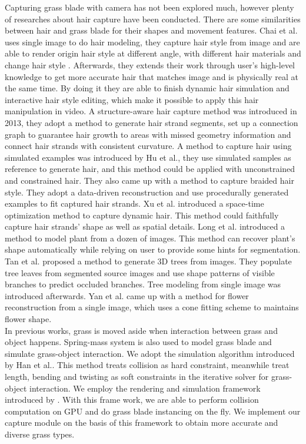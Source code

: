 \documentclass[10pt,journal,compsoc]{IEEEtran}
\begin{document}
Capturing grass blade with camera has not been explored much, however plenty of researches about hair capture have been conducted. There are some similarities between hair and grass blade for their shapes and movement features. Chai et al.\cite{chai2012single} uses single image to do hair modeling, they capture hair style from image and are able to render origin hair style at different angle, with different hair materials and change hair style . Afterwards, they extends their work through user's high-level knowledge to get more accurate hair that matches image and is physically real at the same time. By doing it they are able to finish dynamic hair simulation and interactive hair style editing, which make it possible to apply this hair manipulation in video\cite{chai2013dynamic}. A structure-aware hair capture method\cite{luo2013structure} was introduced in 2013, they adopt a method to generate hair strand segments, set up a connection graph to guarantee hair growth to areas with missed geometry information and connect hair strands with consistent curvature. A method to capture hair using simulated examples was introduced by Hu et al.\cite{hu2014robust}, they use simulated samples as reference to generate hair, and this method could be applied with unconstrained and constrained hair. They also came up with a method to capture braided hair style\cite{hu2014capturing}. They adopt a data-driven reconstruction and use procedurally generated examples to fit captured hair strands. Xu et al. introduced a space-time optimization method to capture dynamic hair. This method could faithfully capture hair strands' shape as well as spatial details. Long et al.\cite{quan2006image} introduced a method to model plant from a dozen of images. This method can recover plant's shape automatically while relying on user to provide some hints for segmentation. Tan et al.\cite{tan2007image} proposed a method to generate 3D trees from images. They populate tree leaves from segmented source images and use shape patterns of visible branches to predict occluded branches. Tree modeling from single image was introduced afterwards\cite{tan2008single}. Yan et al.\cite{yan2014flower} came up with a method for flower reconstruction from a single image, which uses a cone fitting scheme to maintains flower shape.
 \\

In previous works, grass is moved aside when interaction between grass and object happens\cite{guerraz2003procedural}. Spring-mass system is also used to model grass blade and simulate grass-object interaction\cite{chen2010real}\cite{hempe2013generation}. We adopt the simulation algorithm introduced by Han et al.\cite{han2012real}. This method treats collision as hard constraint, meanwhile treat length, bending and twisting as soft constraints in the iterative solver for grass-object interaction. We employ the rendering and simulation framework introduced by \cite{fan2015simulation}. With this frame work, we are able to perform collision computation on GPU and do grass blade instancing on the fly.  We implement our capture module on the basis of this framework to obtain more accurate and diverse grass types.\\
\end{document}
